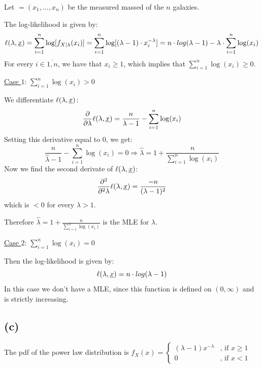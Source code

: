 \documentclass[11pt]{article}
\newcommand{\defaultindent}{\hspace{15pt}}
\newcommand{\subsectionindent}{\hspace{30pt}}
\begin{document}
Let  $ = (x_1, \dots , x_n)$ be the measured massed of the $n$ galaxies.

The log-likelihood is given by: 
\[
\ell (\lambda, \underbar{$x$}) = \sum_{i = 1}^{n} \log [ f_{X | \lambda} (x_i) ] 
= \sum_{i = 1}^{n} \log [ ( \lambda - 1 ) \cdot x_i^{- \lambda} ] 
= n \cdot log (\lambda - 1) - \lambda \cdot \sum_{i = 1}^{n} \log (x_i) 
\]
For every $i \in \overline{1,n}$, we have that $x_i \ge 1$, which implies that $\sum_{i = 1}^{n} \log (x_i) \ge 0$.

\medskip 

\quad \underline{Case $1$}: $\sum_{i = 1}^{n} \log (x_i) > 0$ 

We differentiate $\ell (\lambda, \underbar{$x$})$:
\[
\frac{\partial}{\partial \lambda} \ell (\lambda, \underbar{$x$}) = \frac{n}{\lambda - 1} - \sum_{i = 1}^{n} \log (x_i) 
\]
Setting this derivative equal to $0$, we get:
\[
\frac{n}{\hat{\lambda} - 1} - \sum_{i = 1}^{n} \log (x_i) = 0 
\Rightarrow \hat{\lambda} = 1 + \frac{n}{\sum_{i = 1}^{n} \log (x_i)}
\]
Now we find the second derivate of $\ell (\lambda, \underbar{$x$})$:
\[
\frac{\partial^2}{\partial^2 \lambda} \ell (\lambda, \underbar{$x$}) = \frac{ - n }{ (\lambda - 1)^2 }
\]
which is $< 0$ for every $\lambda > 1$. 

\defaultindent Therefore $\hat{\lambda} = 1 + \frac{n}{\sum_{i = 1}^{n} \log (x_i)}$ is the MLE for $\lambda$.

\medskip

\quad \underline{Case $2$}: $\sum_{i = 1}^{n} \log (x_i) = 0$  

Then the log-likelihood is given by: 
\[
\ell (\lambda, \underbar{$x$}) = n \cdot log (\lambda - 1) 
\]
In this case we don't have a MLE, since this function is defined on $(0,\infty)$ and is strictly increasing.


\subsection*{\subsectionindent (c)}

The pdf of the power law distribution is 
$ f_X (x) = 
            \begin{cases}
              (\lambda - 1) x^{- \lambda} & \text{, if } x \ge 1
              \\ 0                        & \text{, if } x < 1
            \end{cases}
$ 
\end{document}
